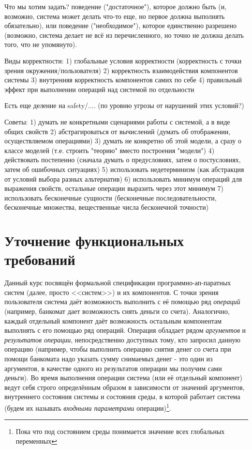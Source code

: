 \documentclass[14pt, twoside]{extreport}
\begin{document}
Что мы хотим задать? поведение ("достаточное"), которое должно быть (и, возможно, система может делать что-то еще, но первое должна выполнять обязательно), или поведение ("необходимое"), которое единственно разрешено (возможно, система делает не всё из перечисленного, но точно не должна делать того, что не упомянуто).

Виды корректности:
1) глобальные условия корректности (корректность с точки зрения окружения/пользователя)
2) корректность взаимодействия компонентов системы
3) внутренняя корректность компонентов самих по себе
4) правильный эффект при выполнении операций над системой по отдельности


Есть еще деление на safety/.... (по уровню угрозы от нарушений этих условий?)


Советы:
1) думать не конкретными сценариями работы с системой, а в виде общих свойств
2) абстрагироваться от вычислений (думать об отображении, осуществляемом операциями)
3) думать не конкретно об этой модели, а сразу о классе моделей (т.е. строить "теорию" вместо построения "модели")
4) действовать постепенно (сначала думать о предусловиях, затем о постусловиях, затем об ошибочных ситуациях)
5) использовать недетерминизм (как абстракция от условий выбора разных альтернатив)
6) использовать минимум операций для выражения свойств, остальные операции выразить через этот минимум
7) использовать бесконечные сущности (бесконечные последовательности, бесконечные множества, вещественные числа бесконечной точности) 

\chapter{Уточнение функциональных требований}



Данный курс посвящён формальной спецификации программно-ап-паратных систем (далее, просто <<систем>>) и их компонентов. С точки зрения пользователя система даёт возможность выполнить с её помощью ряд \emph{операций} (например, банкомат дает возможность снять деньги со счета). Аналогично, каждый отдельный компонент даёт возможность остальным компонентам выполнять с его помощью ряд операций. Операция обладает рядом \emph{аргументов} и \emph{результатов операции}, непосредственно доступных тому, кто запросил данную операцию (например, чтобы выполнить операцию снятия денег со счета при помощи банкомата надо указать сумму снимаемых денег - это один из аргументов, в качестве одного из результатов операции мы получим сами деньги). Во время выполнения операции система (или её отдельный компонент) ведут себя строго определённым образом в зависимости от значений аргументов, внутреннего состояния системы и состояния среды, в которой работает система (будем их называть \emph{входными параметрами} операции)\footnote{Пока что под состоянием среды понимается значение всех глобальных переменных}.
\end{document}
